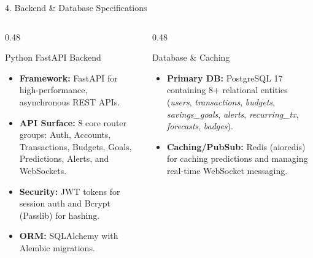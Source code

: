 \documentclass[10pt,aspectratio=169]{beamer}
\begin{document}
\begin{frame}{4. Backend \& Database Specifications}
    \begin{columns}[T]
        \begin{column}{0.48\textwidth}
            \begin{block}{Python FastAPI Backend}
                \begin{itemize}
                    \item \textbf{Framework:} FastAPI for high-performance, asynchronous REST APIs.
                    \item \textbf{API Surface:} 8 core router groups: Auth, Accounts, Transactions, Budgets, Goals, Predictions, Alerts, and WebSockets.
                    \item \textbf{Security:} JWT tokens for session auth and Bcrypt (Passlib) for hashing.
                    \item \textbf{ORM:} SQLAlchemy with Alembic migrations.
                \end{itemize}
            \end{block}
        \end{column}
        \begin{column}{0.48\textwidth}
            \begin{block}{Database \& Caching}
                \begin{itemize}
                    \item \textbf{Primary DB:} PostgreSQL 17 containing 8+ relational entities (\textit{users}, \textit{transactions}, \textit{budgets}, \textit{savings\_goals}, \textit{alerts}, \textit{recurring\_tx}, \textit{forecasts}, \textit{badges}).
                    \item \textbf{Caching/PubSub:} Redis (aioredis) for caching predictions and managing real-time WebSocket messaging.
                \end{itemize}
            \end{block}
        \end{column}
    \end{columns}
\end{frame}
\end{document}
